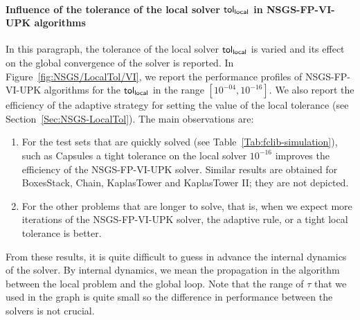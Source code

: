\paragraph{Influence of the tolerance of the local solver $\sf tol_{local}$ in {\sf NSGS-FP-VI-UPK} algorithms}
In this paragraph, the tolerance of the local solver $\sf tol_{local}$  is varied and its effect on the global convergence of the solver is reported. In Figure~\ref{fig:NSGS/LocalTol/VI},  we report the performance profiles of {\sf NSGS-FP-VI-UPK} algorithms for the $\sf tol_{local}$ in the range $[10^{-04}, 10^{-16}]$. We also report the efficiency of the adaptive strategy for setting the value of the local tolerance (see Section~\ref{Sec:NSGS-LocalTol}). The main observations are:
\begin{enumerate}
\item For the test sets that are quickly solved (see Table~\ref{Tab:fclib-simulation}), such as   Capsules  a tight tolerance on the local solver $10^{-16}$ improves the efficiency  of the {\sf NSGS-FP-VI-UPK} solver. Similar results are obtained for BoxesStack, Chain, KaplasTower and KaplasTower II; they are not depicted. 
\item For the other problems that are longer to solve, that is, when we expect more iterations of the  {\sf NSGS-FP-VI-UPK} solver, the adaptive rule, or a tight local tolerance is better.
\end{enumerate}
From these results, it is quite difficult to guess in advance the internal dynamics of the solver. By internal dynamics, we mean the propagation in the algorithm between the local problem and the global loop. Note that the range of $\tau$ that we used in the graph is quite small so the difference in performance between the solvers is not crucial.


